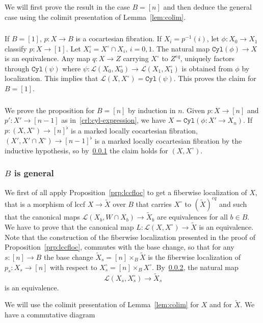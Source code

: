 \documentclass[12pt]{amsart}%
\newcommand{\Cyl}{\mathtt{Cyl}}
\newcommand{\eq}{\mathit{eq}}
\newcommand{\wt}{\widetilde}
\newcommand{\cL}{\mathcal{L}}
\begin{document}
We will first prove the result in the case $B=[n]$ and
then deduce the general case using the colimit presentation of Lemma~\ref{lem:colim}.
\subsubsection{}
\label{sss:1}
If $B=[1]$, $p:X\to B$ is a cocartesian fibration. If $X_i=p^{-1}(i)$, 
let $\phi:X_0\to X_1$ classify $p:X\to[1]$. Let $X^\circ_i=X^\circ\cap X_i$, $i=0,1$. 
The natural map $\Cyl(\phi)\to X$ is an equivalence. Any map $q:X\to Z$
carrying $X^\circ$ to $Z^\eq$, uniquely factors through $\Cyl(\psi)$
where $\psi:\cL(X_0,X^\circ_0)\to\cL(X_1,X^\circ_1)$ is obtained from 
$\phi$ by localization. This implies that $\cL(X,X^\circ)=\Cyl(\psi)$.
This proves the claim for $B=[1]$.

\subsubsection{}
\label{sss:simplex}
We   prove the  proposition for $B=[n]$ by induction
in $n$. Given $p:X\to[n]$ and $p':X'\to[n-1]$ as 
in~\ref{crl:cyl-expression},
we have $X=\Cyl(\phi:X'\to X_n)$. If $p:(X,X^\circ)\to[n]^\flat$ is a marked locally cocartesian fibration, $(X',X'\cap X^\circ)\to[n-1]^\flat$
is a marked locally cocartesian fibration by the inductive hypothesis, 
so by~\ref{sss:1} the claim holds for $(X,X^\circ)$.

\subsubsection{$B$ is general}

We first of all apply Proposition~\ref{prp:lccfloc} to get 
a fiberwise localization of $X$, that is a morphism of lccf
$X\to\wt X$ over $B$ that carries $X^\circ$ to   $(\wt X)^\eq$ and such that the canonical maps $\cL(X_b, W\cap X_b)\to \wt X_b$ are equivalences for all $b\in B$. We have to prove that the canonical map 
$L:\cL(X,X^\circ)\to\wt X$ is an equivalence.  Note that the construction of
the fiberwise localization presented in the proof of Proposition~\ref{prp:lccfloc}, commutes with the base change, so
that for any $s:[n]\to B$ the base change $\wt X_s=[n]\times_B\wt X$ is the fiberwise
localization of $p_s:X_s\to[n]$ with respect to $X^\circ_s=[n]\times_BX^\circ$. By~\ref{sss:simplex}, the natural map
$$
\cL(X_s,X_s^\circ)\to \wt X_s
$$
is an equivalence.

We will use the colimit presentation 
of Lemma~\ref{lem:colim} for $X$ and for $\wt X$.  We have
a commutative diagram
\end{document}
